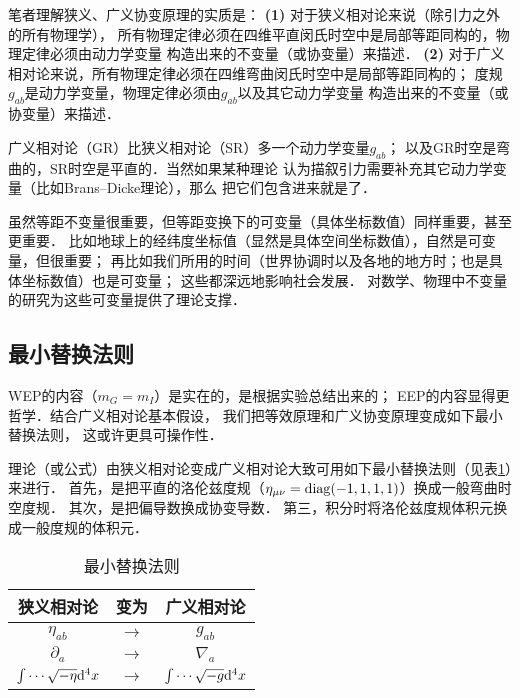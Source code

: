 笔者理解{\heiti 狭义、广义协变原理}的实质是：
{\bfseries (1)} 对于狭义相对论来说（除引力之外的所有物理学），
所有物理定律必须在四维平直闵氏时空中是局部等距同构的，物理定律必须由动力学变量
构造出来的不变量（或协变量）来描述．
{\bfseries (2)} 对于广义相对论来说，所有物理定律必须在四维弯曲闵氏时空中是局部等距同构的；
度规$g_{ab}$是动力学变量，物理定律必须由$g_{ab}$以及其它动力学变量
构造出来的不变量（或协变量）来描述．



广义相对论（GR）比狭义相对论（SR）多一个动力学变量$g_{ab}$；
以及GR时空是弯曲的，SR时空是平直的．当然如果某种理论
认为描叙引力需要补充其它动力学变量（比如Brans--Dicke理论），那么
把它们包含进来就是了．

虽然等距不变量很重要，但等距变换下的{\kaishu 可变量}（具体坐标数值）同样重要，甚至更重要．
比如地球上的经纬度坐标值（显然是具体空间坐标数值），自然是可变量，但很重要；
再比如我们所用的时间（世界协调时以及各地的地方时；也是具体坐标数值）也是可变量；
这些都深远地影响社会发展．
对数学、物理中不变量的研究为这些可变量提供了理论支撑．



\subsection{最小替换法则}\label{chfd:sec_sr2gr}
WEP的内容（$m_G=m_I$）是实在的，是根据实验总结出来的；
EEP的内容显得更哲学．结合广义相对论基本假设，
我们把等效原理和广义协变原理变成如下最小替换法则\cite[\S 16.2]{mtw1973}，
这或许更具可操作性．

理论（或公式）由狭义相对论变成广义相对论大致可用如下{\heiti 最小替换法则}（见表\ref{chfd:tab-sr2gr}）来进行．
首先，是把平直的洛伦兹度规（$\eta_{\mu\nu}={\rm diag}(-1,1,1,1)$）换成一般弯曲时空度规．
其次，是把偏导数换成协变导数．
第三，积分时将洛伦兹度规体积元换成一般度规的体积元．
\begin{table}[htb]
    \centering
    \caption{最小替换法则} \label{chfd:tab-sr2gr}
    \begin{tabular}{|*3{c|}}
        \hline
        狭义相对论 & 变为 & 广义相对论 \\ \hline
        $\eta_{ab}$ & $\to$ & $g_{ab}$   \\ \hline
        $\partial_{a}$ & $\to$ & $\nabla_{a}$   \\ \hline
        $\int\cdots\sqrt{-\eta}{\rm d}^4x$ & $\to$ & $\int\cdots \sqrt{-g}{\rm d}^4x$   \\ \hline
    \end{tabular}
\end{table}

